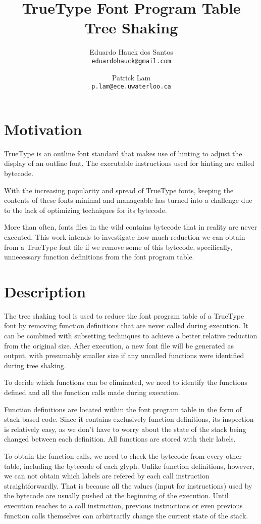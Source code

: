 \documentclass[12pt]{article}
\title{TrueType Font Program Table Tree Shaking}
\author{
  Eduardo Hauck dos Santos\\
  \texttt{eduardohauck@gmail.com}
  \and
  Patrick Lam\\
  \texttt{p.lam@ece.uwaterloo.ca}
}
\date{}
\begin{document}
\maketitle

\section{Motivation}
TrueType is an outline font standard that makes use of hinting to adjust
the display of an outline font. The executable instructions used for
hinting are called bytecode.

With the increasing popularity and spread of TrueType fonts, keeping the
contents of these fonts minimal and manageable has turned into a
challenge due to the lack of optimizing techniques for its bytecode.

More than often, fonts files in the wild contains bytecode that in
reality are never executed. This work intends to investigate how much
reduction we can obtain from a TrueType font file if we remove some of
this bytecode, specifically, unnecessary function definitions from the
font program table.

\section{Description}

The tree shaking tool is used to reduce the font program table of a
TrueType font by removing function definitions that are never called
during execution. It can be combined with subsetting techniques to
achieve a better relative reduction from the original size. After
execution, a new font file will be generated as output, with presumably
smaller size if any uncalled functions were identified during tree shaking.

To decide which functions can be eliminated, we need to identify the
functions defined and all the function calls made during execution.

Function definitions are located within the font program table in the
form of stack based code. Since it contains exclusively function
definitions, its inspection is relatively easy, as we don't have to
worry about the state of the stack being changed between each
definition. All functions are stored with their labels.

To obtain the function calls, we need to check the bytecode from every
other table, including the bytecode of each glyph. Unlike function
definitions, however, we can not obtain which labels are refered by each
call instruction straightforwardly. That is because all the values
(input for instructions) used by the bytecode are usually pushed at the
beginning of the execution. Until execution reaches to a call
instruction, previous instructions or even previous function calls
themselves can arbirtrarily change the current state of the stack.
\end{document}
